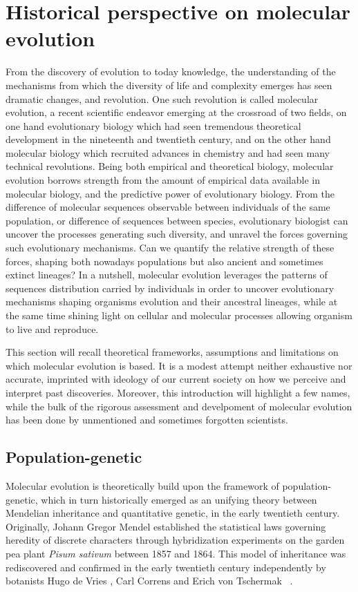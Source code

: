 \thispagestyle{empty}
\chapter{Historical perspective on molecular evolution}
{\hypersetup{linkcolor=GREYDARK}\minitoc}
\label{chap:intro-historical}

From the discovery of evolution to today knowledge, the understanding of the mechanisms from which the diversity of life and complexity emerges has seen dramatic changes, and revolution.
One such revolution is called molecular evolution, a recent scientific endeavor emerging at the crossroad of two fields, on one hand evolutionary biology which had seen tremendous theoretical development in the nineteenth and twentieth century, and on the other hand molecular biology which recruited advances in chemistry and had seen many technical revolutions.
Being both empirical and theoretical biology, molecular evolution borrows strength from the amount of empirical data available in molecular biology, and the predictive power of evolutionary biology.
From the difference of molecular sequences observable between individuals of the same population, or difference of sequences between species, evolutionary biologist can uncover the processes generating such diversity, and unravel the forces governing such evolutionary mechanisms.
Can we quantify the relative strength of these forces, shaping both nowadays populations but also ancient and sometimes extinct lineages?
In a nutshell, molecular evolution leverages the patterns of sequences distribution carried by individuals in order to uncover evolutionary mechanisms shaping organisms evolution and their ancestral lineages, while at the same time shining light on cellular and molecular processes allowing organism to live and reproduce.

This section will recall theoretical frameworks, assumptions and limitations on which molecular evolution is based.
It is a modest attempt neither exhaustive nor accurate, imprinted with ideology of our current society on how we perceive and interpret past discoveries.
Moreover, this introduction will highlight a few names, while the bulk of the rigorous assessment and develpoment of molecular evolution has been done by unmentioned and sometimes forgotten scientists.

\section{Population-genetic}
Molecular evolution is theoretically build upon the framework of population-genetic, which in turn historically emerged as an unifying theory between Mendelian inheritance and quantitative genetic, in the early twentieth century.
Originally,
Johann Gregor Mendel%
 established the statistical laws governing heredity of discrete characters through hybridization experiments on the garden pea plant \textit{Pisum sativum} between 1857 and 1864.
This model of inheritance was rediscovered and confirmed in the early twentieth century independently by botanists
Hugo de Vries%
, Carl Correns%
 and Erich von Tschermak%
 ~\citep{dunn2003gregor}.

